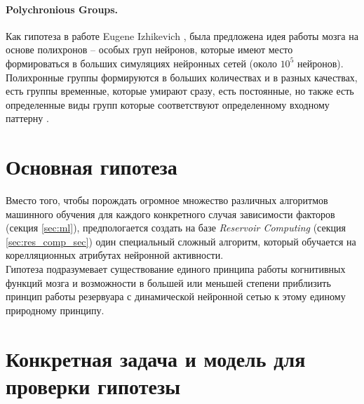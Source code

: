 \documentclass[a4paper,10pt]{article}
\begin{document}
\paragraph*{Polychronious Groups.}
Как гипотеза в работе Eugene Izhikevich \cite{izh_groups}, была предложена идея работы мозга на основе полихронов -- особых груп нейронов, которые имеют место формироваться в больших симуляциях нейронных сетей (около $10^5$ нейронов). Полихронные группы формируются в больших количествах и в разных качествах, есть группы временные, которые умирают сразу, есть постоянные, но также есть определенные виды групп которые соответствуют определенному входному паттерну \cite{patt_groups}.

\section{Основная гипотеза}
Вместо того, чтобы порождать огромное множество различных алгоритмов машинного обучения для каждого конкретного случая зависимости факторов (секция \ref{sec:ml}), предпологается создать на базе \textit{Reservoir Computing} (секция \ref{sec:res_comp_sec}) один специальный сложный алгоритм, который обучается на корелляционных атрибутах нейронной активности.\\
\indent Гипотеза подразумевает существование единого принципа работы когнитивных функций мозга и возможности в большей или меньшей  степени приблизить принцип работы резервуара с динамической нейронной сетью к этому единому природному принципу.\\

\section{Конкретная задача и модель для проверки гипотезы}
\end{document}

